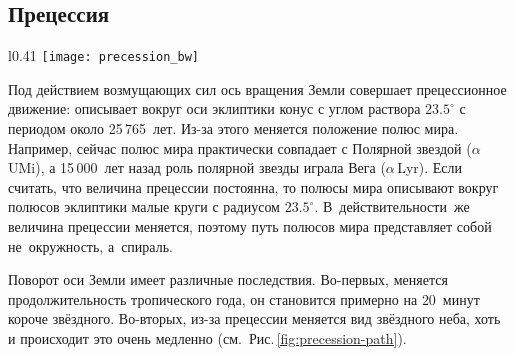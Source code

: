 \subsection{Прецессия}
\begin{wrapfigure}[15]{l}{0.41\tw}
	\vspace{-1pc}
	\centering
	\texttt{[image: precession\_bw]}
	\caption{Прецессионное движение северного полюса мира}
	\label{fig:precession-path}
\end{wrapfigure}
Под действием возмущающих сил ось вращения Земли совершает прецессионное движение: описывает вокруг оси эклиптики конус с углом раствора $23.5^\circ$ с периодом около  25\,765~лет. Из-за этого меняется положение полюс мира. Например, сейчас полюс мира практически совпадает с Полярной звездой ($\alpha$\,UMi), а 15\,000~лет назад роль полярной звезды играла Вега ($\alpha$\,Lyr). Если считать, что величина прецессии постоянна, то полюсы мира описывают вокруг полюсов эклиптики малые круги с радиусом $23.5^\circ$. В~действительности~же величина прецессии меняется, поэтому путь полюсов мира представляет собой не~окружность, а~спираль.

Поворот оси Земли имеет различные последствия. Во-первых, меняется продолжительность тропического года, он становится примерно на $20$~минут короче звёздного. Во-вторых, из-за прецессии меняется вид звёздного неба, хоть и происходит это очень медленно (см.~Рис.\,\ref{fig:precession-path}).